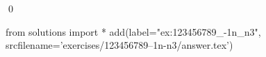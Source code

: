 \begin{ex}
  \label{ex:123456789_-1n_n3}
  
  \mbox{}\\ \\
  \qed
\end{ex}
\begin{python0}
from solutions import *
add(label="ex:123456789_-1n_n3",
    srcfilename='exercises/123456789--1n-n3/answer.tex') 
\end{python0}                              
